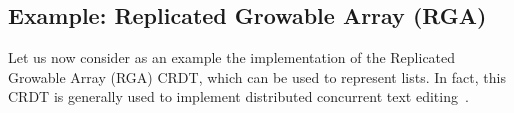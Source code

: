 








\subsection{Example: Replicated Growable Array (RGA)}
\label{sec:rga}

Let us now consider as an example the implementation of the
Replicated Growable Array (RGA) CRDT, which can be used to represent
lists.
In fact, this CRDT is generally used to implement distributed
concurrent text editing~\cite{AttiyaBGMYZ16}.

